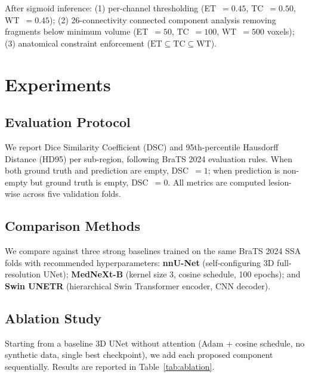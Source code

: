 \documentclass[conference]{IEEEtran}
\begin{document}
After sigmoid inference: (1) per-channel thresholding
(ET~$=0.45$, TC~$=0.50$, WT~$=0.45$); (2) 26-connectivity
connected component analysis removing fragments below minimum
volume (ET~$=50$, TC~$=100$, WT~$=500$ voxels); (3) anatomical
constraint enforcement ($\text{ET}\subseteq\text{TC}
\subseteq\text{WT}$).

\section{Experiments}

\subsection{Evaluation Protocol}

We report Dice Similarity Coefficient (DSC) and 95th-percentile
Hausdorff Distance (HD95) per sub-region, following BraTS 2024
evaluation rules. When both ground truth and prediction are empty,
DSC~$=1$; when prediction is non-empty but ground truth is empty,
DSC~$=0$. All metrics are computed lesion-wise across five
validation folds.

\subsection{Comparison Methods}

We compare against three strong baselines trained on the same
BraTS 2024 SSA folds with recommended hyperparameters:
\textbf{nnU-Net} \cite{b2} (self-configuring 3D full-resolution
UNet); \textbf{MedNeXt-B} \cite{b3} (kernel size 3, cosine
schedule, 100 epochs); and \textbf{Swin UNETR} \cite{b4}
(hierarchical Swin Transformer encoder, CNN decoder).

\subsection{Ablation Study}

Starting from a baseline 3D UNet without attention (Adam + cosine
schedule, no synthetic data, single best checkpoint), we add each
proposed component sequentially. Results are reported in
Table~\ref{tab:ablation}.
\end{document}
